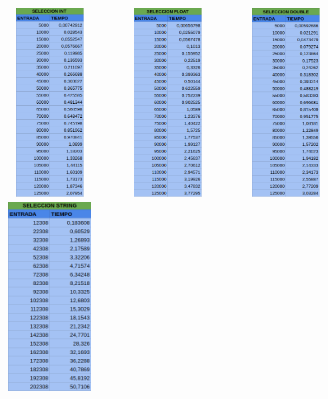 \documentclass[11pt]{article}
\begin{document}
\begin{figure}[H]
    \begin{minipage}{0.5\textwidth}
        \centering
        \includegraphics[width=3cm, height=5cm]{assets/Img/selecciontabla1.png}

    \end{minipage}%
    \begin{minipage}{0.5\textwidth}
        \centering
        \includegraphics[width=3cm, height=5cm]{assets/Img/selecciontabla2.png}

    \end{minipage}
    \begin{minipage}{0.5\textwidth}
        \centering
        \includegraphics[width=3cm, height=5cm]{assets/Img/selecciontabla3.png}

    \end{minipage}
    \begin{minipage}{0.5\textwidth}
        \centering
        \includegraphics[width=3cm, height=5cm]{assets/Img/selecciontabla4.png}
    \end{minipage}
\end{figure}
\end{document}
